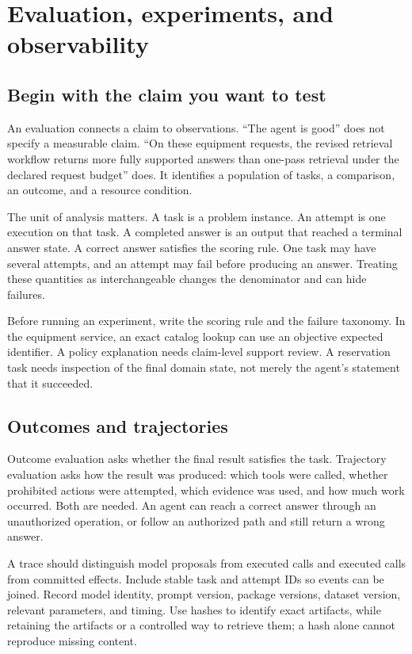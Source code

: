 \chapter{Evaluation, experiments, and observability}
\section{Begin with the claim you want to test}
An evaluation connects a claim to observations. “The agent is good” does not specify a measurable claim. “On these equipment requests, the revised retrieval workflow returns more fully supported answers than one-pass retrieval under the declared request budget” does. It identifies a population of tasks, a comparison, an outcome, and a resource condition.

The unit of analysis matters. A task is a problem instance. An attempt is one execution on that task. A completed answer is an output that reached a terminal answer state. A correct answer satisfies the scoring rule. One task may have several attempts, and an attempt may fail before producing an answer. Treating these quantities as interchangeable changes the denominator and can hide failures.

Before running an experiment, write the scoring rule and the failure taxonomy. In the equipment service, an exact catalog lookup can use an objective expected identifier. A policy explanation needs claim-level support review. A reservation task needs inspection of the final domain state, not merely the agent's statement that it succeeded.

\section{Outcomes and trajectories}
Outcome evaluation asks whether the final result satisfies the task. Trajectory evaluation asks how the result was produced: which tools were called, whether prohibited actions were attempted, which evidence was used, and how much work occurred. Both are needed. An agent can reach a correct answer through an unauthorized operation, or follow an authorized path and still return a wrong answer.

A trace should distinguish model proposals from executed calls and executed calls from committed effects. Include stable task and attempt IDs so events can be joined. Record model identity, prompt version, package versions, dataset version, relevant parameters, and timing. Use hashes to identify exact artifacts, while retaining the artifacts or a controlled way to retrieve them; a hash alone cannot reproduce missing content.

